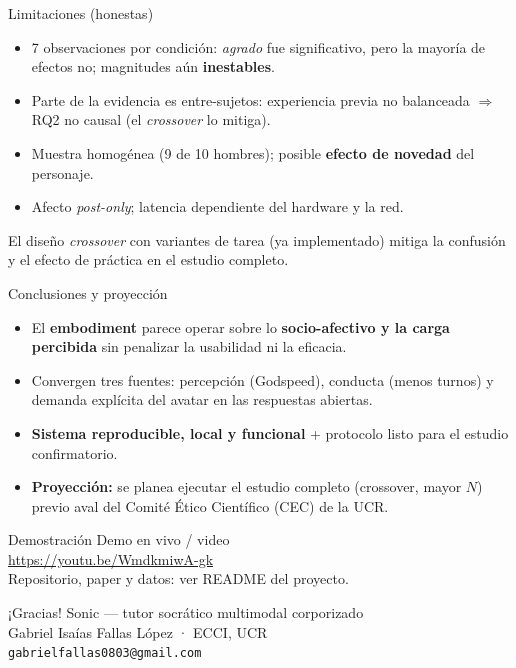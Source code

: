 \documentclass[aspectratio=169]{beamer}
\begin{document}
\begin{frame}{Limitaciones (honestas)}
  \begin{itemize}
    \item 7 observaciones por condición: \emph{agrado} fue significativo, pero la mayoría de
          efectos no; magnitudes aún \textbf{inestables}.
    \item Parte de la evidencia es entre-sujetos: experiencia previa no balanceada $\Rightarrow$
          RQ2 no causal (el \emph{crossover} lo mitiga).
    \item Muestra homogénea (9 de 10 hombres); posible \textbf{efecto de novedad} del personaje.
    \item Afecto \emph{post-only}; latencia dependiente del hardware y la red.
  \end{itemize}
  \vspace{0.4em}
  El diseño \emph{crossover} con variantes de tarea (ya implementado) mitiga la confusión y el
  efecto de práctica en el estudio completo.
\end{frame}

\begin{frame}{Conclusiones y proyección}
  \begin{itemize}
    \item El \textbf{embodiment} parece operar sobre lo \textbf{socio-afectivo y la carga
          percibida} sin penalizar la usabilidad ni la eficacia.
    \item Convergen tres fuentes: percepción (Godspeed), conducta (menos turnos) y demanda
          explícita del avatar en las respuestas abiertas.
    \item \textbf{Sistema reproducible, local y funcional} + protocolo listo para el estudio
          confirmatorio.
    \item \textbf{Proyección:} se planea ejecutar el estudio completo (crossover, mayor $N$) previo
          aval del Comité Ético Científico (CEC) de la UCR.
  \end{itemize}
\end{frame}

\begin{frame}{Demostración}
  \centering
  \vspace{1em}
  {\Large Demo en vivo / video}\\[0.8em]
  \url{https://youtu.be/WmdkmiwA-gk}\\[1.2em]
  \footnotesize Repositorio, paper y datos: ver README del proyecto.
\end{frame}

\begin{frame}{¡Gracias!}
  \centering
  \Large Sonic — tutor socrático multimodal corporizado\\[1em]
  \normalsize Gabriel Isaías Fallas López · ECCI, UCR\\
  \texttt{gabrielfallas0803@gmail.com}
\end{frame}
\end{document}
